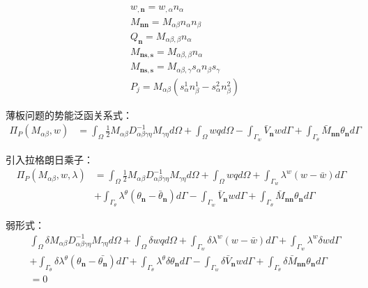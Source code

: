 \begin{equation}
\begin{split}
    &w_{,\pmb{n}}=w_{,\alpha}n_{\alpha}\\
    &M_{\pmb{nn}}=M_{\alpha\beta}n_{\alpha}n_{\beta}\\
    &Q_{\pmb{n}}=M_{\alpha\beta,\beta}n_{\alpha}\\
    &M_{\pmb{ns},\pmb{s}}=M_{\alpha\beta,\beta}n_{\alpha}\\
    &M_{\pmb{ns},\pmb{s}}=M_{\alpha\beta,\gamma}s_{\alpha}n_{\beta}s_{\gamma}\\
    &P_j=M_{\alpha\beta}(s^1_{\alpha}n^1_{\beta}-s^2_{\alpha}n^2_{\beta})
\end{split}
\end{equation}\par
薄板问题的势能泛函关系式：
\begin{equation}
\begin{split}
    \Pi_P(M_{\alpha\beta},w)&=\int_{\Omega}\frac{1}{2}M_{\alpha\beta}D^{-1}_{\alpha\beta\gamma\eta}M_{\gamma\eta}d\Omega+\int_{\Omega}wqd\Omega-\int_{\Gamma_w}\bar{V}_{\pmb{n}}wd\Gamma+\int_{\Gamma_{\theta}}\bar{M}_{\pmb{nn}}\theta_{\pmb{n}}d\Gamma
\end{split}
\end{equation}\par
引入拉格朗日乘子：
\begin{equation}
\begin{split}
    \Pi_P(M_{\alpha\beta},w,\lambda)&=\int_{\Omega}\frac{1}{2}M_{\alpha\beta}D^{-1}_{\alpha\beta\gamma\eta}M_{\gamma\eta}d\Omega+\int_{\Omega}wqd\Omega+\int_{\Gamma_w}\lambda^w(w-\bar{w})d\Gamma\\
    &+\int_{\Gamma_{\theta}}\lambda^{\theta}(\theta_{\pmb{n}}-\bar{\theta}_{\pmb{n}})d\Gamma-\int_{\Gamma_w}\bar{V}_{\pmb{n}}wd\Gamma+\int_{\Gamma_{\theta}}\bar{M}_{\pmb{nn}}\theta_{\pmb{n}}d\Gamma
\end{split}
\end{equation}\par
弱形式：
\begin{equation}
\begin{split}
    &\int_{\Omega}\delta M_{\alpha\beta}D^{-1}_{\alpha\beta\gamma\eta}M_{\gamma\eta}d\Omega+\int_{\Omega}\delta wqd\Omega+\int_{\Gamma_w}\delta\lambda^w(w-\bar{w})d\Gamma+\int_{\Gamma_w}\lambda^w\delta wd\Gamma\\
    &+\int_{\Gamma_{\theta}}\delta\lambda^{\theta}(\theta_{\pmb{n}}-\bar{\theta_{\pmb{n}}})d\Gamma+\int_{\Gamma_{\theta}}\lambda^{\theta}\delta\theta_{\pmb{n}}d\Gamma-\int_{\Gamma_w}\delta\bar{V}_{\pmb{n}}wd\Gamma+\int_{\Gamma_{\theta}}\delta\bar{M}_{\pmb{nn}}\theta_{\pmb{n}}d\Gamma\\
    &=0
\end{split}
\end{equation}